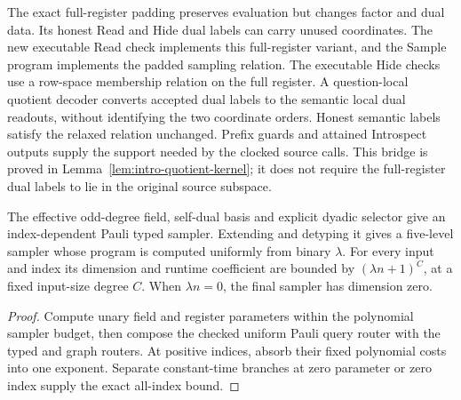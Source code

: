 \begin{remark}
\label{rem:intro-padded-dual-format}
The exact full-register padding preserves evaluation but changes factor
and dual data. Its honest Read and Hide dual labels can carry unused
coordinates. The new executable Read check implements this full-register
variant, and the Sample program implements the padded sampling relation.
The executable Hide checks use a row-space membership relation on the full
register. A question-local quotient decoder converts accepted dual labels
to the semantic local dual readouts, without identifying the two coordinate
orders. Honest semantic labels satisfy the relaxed relation unchanged.
Prefix guards and attained Introspect outputs supply the support needed by
the clocked source calls. This bridge is proved in
Lemma~\ref{lem:intro-quotient-kernel}; it does not require the full-register
dual labels to lie in the original source subspace.
\end{remark}

\begin{lemma}
\label{lem:intro-canonical-sampler}
\leanok
The effective odd-degree field, self-dual basis and explicit dyadic selector
give an index-dependent Pauli typed sampler. Extending and detyping it gives
a five-level sampler whose program is computed uniformly from binary
$\lambda$. For every input and index its dimension and runtime coefficient
are bounded by $(\lambda n+1)^C$, at a fixed input-size degree $C$.
When $\lambda n=0$, the final sampler has dimension zero.
\end{lemma}
\begin{proof}
\leanok
Compute unary field and register parameters within the polynomial sampler
budget, then compose the checked uniform Pauli query router with the typed
and graph routers. At positive indices, absorb their fixed polynomial costs
into one exponent. Separate constant-time branches at zero parameter or zero
index supply the exact all-index bound.
\end{proof}

